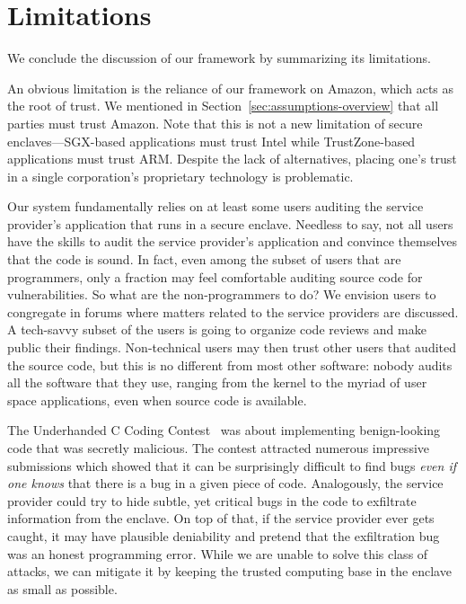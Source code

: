 \section{Limitations}%
\label{sec:limitations}

We conclude the discussion of our framework by summarizing its limitations.

An obvious limitation is the reliance of our framework on Amazon, which acts as
the root of trust.  We mentioned in Section~\ref{sec:assumptions-overview} that
all parties must trust Amazon.  Note that this is not a new limitation of secure
enclaves---SGX-based applications must trust Intel while TrustZone-based
applications must trust ARM.  Despite the lack of alternatives, placing one's
trust in a single corporation's proprietary technology is problematic.

Our system fundamentally relies on at least some users auditing the service
provider's application that runs in a secure enclave.  Needless to say, not all
users have the skills to audit the service provider's application and convince
themselves that the code is sound.  In fact, even among the subset of users that
are programmers, only a fraction may feel comfortable auditing source code for
vulnerabilities.  So what are the non-programmers to do?  We envision users to
congregate in forums where matters related to the service providers are
discussed.  A tech-savvy subset of the users is going to organize code reviews
and make public their findings.  Non-technical users may then trust other users
that audited the source code, but this is no different from most other software:
nobody audits all the software that they use, ranging from the kernel to the
myriad of user space applications, even when source code is available.

The Underhanded C Coding Contest~\cite{underhanded-c} was about implementing
benign-looking code that was secretly malicious.  The contest attracted numerous
impressive submissions which showed that it can be surprisingly difficult to
find bugs \emph{even if one knows} that there is a bug in a given piece of code.
Analogously, the service provider could try to hide subtle, yet critical bugs in
the code to exfiltrate information from the enclave.  On top of that, if the
service provider ever gets caught, it may have plausible deniability and pretend
that the exfiltration bug was an honest programming error.  While we are unable
to solve this class of attacks, we can mitigate it by keeping the trusted
computing base in the enclave as small as possible.
